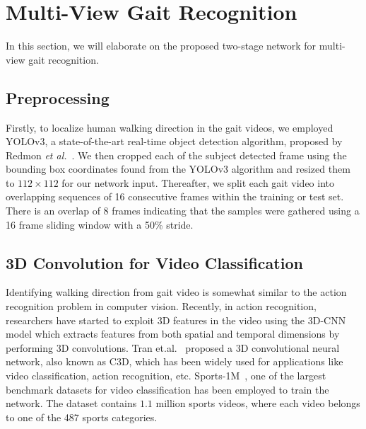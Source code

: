 \section{Multi-View Gait Recognition} \label{sec:multi_view_arch}
In this section, we will elaborate on the proposed two-stage network for multi-view gait recognition. 


\subsection{Preprocessing}
Firstly, to localize human walking direction in the gait videos, we employed YOLOv3, a state-of-the-art real-time object detection algorithm, proposed by Redmon \textit{et al.}~\cite{Redmon_18}. We then cropped each of the subject detected frame using the bounding box coordinates found from the YOLOv3 algorithm and resized them to $112\times112$ for our network input. Thereafter, we split each gait video into overlapping sequences of 16 consecutive frames within the training or test set. There is an overlap of 8 frames indicating that the samples were gathered using a 16 frame sliding window with a 50\% stride.


\subsection{3D Convolution for Video Classification}
Identifying walking direction from gait video is somewhat similar to the action recognition problem in computer vision. Recently, in action recognition, researchers have started to exploit 3D features in the video using the 3D-CNN model which extracts features from both spatial and temporal dimensions by performing 3D convolutions. Tran et.al.~\cite{Tran_15} proposed a 3D convolutional neural network, also known as C3D, which has been widely used for applications like video classification, action recognition, etc. Sports-1M~\cite{karpathy_14}, one of the largest benchmark datasets for video classification has been employed to train the network. The dataset contains $ 1.1$ million sports videos, where each video belongs to one of the 487 sports categories. 

